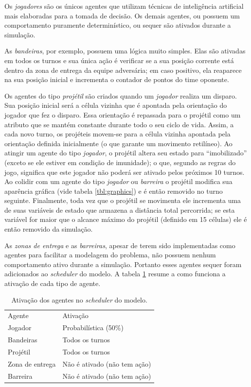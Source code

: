 \documentclass[preprint,12pt]{elsarticle}
\begin{document}
Os \textit{jogadores} são os únicos agentes que utilizam técnicas de inteligência artificial mais elaboradas para a tomada de decisão. Os demais agentes, ou possuem um comportamento puramente determinístico, ou sequer são ativados durante a simulação. 

As \textit{bandeiras}, por exemplo, possuem uma lógica muito simples. Elas são ativadas em todos os turnos e sua única ação é verificar se a sua posição corrente está dentro da zona de entrega da equipe adversária; em caso positivo, ela reaparece na sua posição inicial e incrementa o contador de pontos do time oponente.

Os agentes do tipo \textit{projétil} são criados quando um \textit{jogador} realiza um disparo. Sua posição inicial será a célula vizinha que é apontada pela orientação do jogador que fez o disparo. Essa orientação é repassada para o projétil como um atributo que se mantém constante durante todo o seu ciclo de vida. Assim, a cada novo turno, os projéteis movem-se para a célula vizinha apontada pela orientação definida inicialmente (o que garante um movimento retilíneo). Ao atingir um agente do tipo \textit{jogador}, o projétil altera seu estado para ``imobilizado'' (exceto se ele estiver em condição de imunidade); o que, segundo as regras do jogo, significa que este jogador não poderá ser ativado pelos próximos 10 turnos. Ao colidir com um agente do tipo \textit{jogador} ou \textit{barreira} o projétil modifica sua aparência gráfica (vide tabela \ref{tbl:graphics}) e é então removido no turno seguinte. Finalmente, toda vez que o projétil se movimenta ele incrementa uma de suas variáveis de estado que armazena a distância total percorrida; se esta variável for maior que o alcance máximo do projétil (definido em 15 células) ele é então removido da simulação.

As \textit{zonas de entrega} e as \textit{barreiras}, apesar de terem sido implementadas como agentes para facilitar a modelagem do problema, não possuem nenhum comportamento ativo durante a simulação. Portanto esses agentes sequer foram adicionados ao \textit{scheduler} do modelo. A tabela \ref{tbl:ativacao} resume a como funciona a ativação de cada tipo de agente.

\begin{table}[h!]
	\begin{center}
		\begin{tabular}{ll}
			\toprule
			Agente & Ativação \\ 
			\cmidrule(r){1-1}\cmidrule(lr){2-2}
			Jogador   & Probabilística (50\%) \\
			Bandeiras & Todos os turnos       \\
			Projétil  & Todos os turnos		  \\
			Zona de entrega & Não é ativado (não tem ação) \\
			Barreira        & Não é ativado (não tem ação)\\
			\bottomrule
		\end{tabular}
		\caption{Ativação dos agentes no \textit{scheduler} do modelo.}
		\label{tbl:ativacao}
	\end{center}
\end{table}
\end{document}
